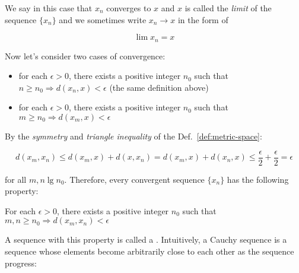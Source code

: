 We say in this case that $x_n$ converges to $x$ and $x$ is called the \textit{limit} of the sequence $\{ x_n \}$ and we
sometimes write $x_n \rightarrow x$ in the form of

\[ \lim x_n = x \]

Now let's consider two cases of convergence:

\begin{itemize}
    \item for each $\epsilon > 0$, there exists a positive integer $n_0$ such that $n \ge n_0 \Rightarrow d(x_n, x) < \epsilon$ (the same definition above)
    \item for each $\epsilon > 0$, there exists a positive integer $n_0$ such that $m \ge n_0 \Rightarrow d(x_m, x) < \epsilon$
\end{itemize}

By the \textit{symmetry} and \textit{triangle inequality} of the Def.~\ref{def:metric-space}:

\begin{equation}
    d(x_m, x_n) \le d(x_m, x) + d(x, x_n) = d(x_m, x) + d(x_n, x) \le \frac{\epsilon}{2} + \frac{\epsilon}{2} = \epsilon
\end{equation}

for all $m, n \lg n_0$. Therefore, every convergent sequence $\{ x_n \}$ has the following property:

\begin{tcolorbox}[
    colback=green!5!white,
    colframe=green!75!black,
    colbacktitle=red!85!black
]
    \begin{center}
        For each $\epsilon > 0$, there exists a positive integer $n_0$ such that $m, n \ge n_0 \Rightarrow d(x_m, x_n) < \epsilon$
    \end{center}
\end{tcolorbox}

A sequence with this property is called a . Intuitively, a Cauchy sequence is a
sequence whose elements become arbitrarily close to each other as the sequence progress:

\begin{center}
\end{center}

